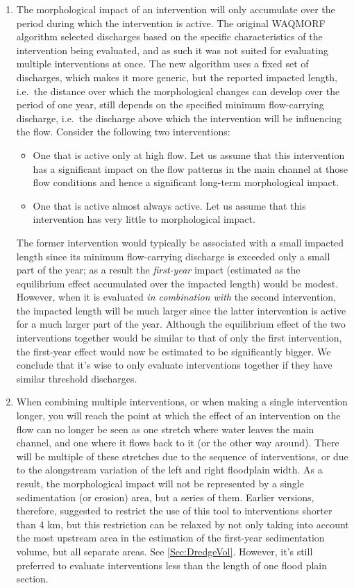 \begin{enumerate}
\item The morphological impact of an intervention will only accumulate over the period during which the intervention is active.
The original WAQMORF algorithm selected discharges based on the specific characteristics of the intervention being evaluated, and as such it was not suited for evaluating multiple interventions at once.
The new algorithm uses a fixed set of discharges, which makes it more generic, but the reported impacted length, i.e.~the distance over which the morphological changes can develop over the period of one year, still depends on the specified minimum flow-carrying discharge, i.e.~the discharge above which the intervention will be influencing the flow.
Consider the following two interventions:
\begin{itemize}
\item One that is active only at high flow.
Let us assume that this intervention has a significant impact on the flow patterns in the main channel at those flow conditions and hence a significant long-term morphological impact.
\item One that is active almost always active.
Let us assume that this intervention has very little to morphological impact.
\end{itemize}
The former intervention would typically be associated with a small impacted length since its minimum flow-carrying discharge is exceeded only a small part of the year; as a result the \emph{first-year} impact (estimated as the equilibrium effect accumulated over the impacted length) would be modest.
However, when it is evaluated \emph{in combination with} the second intervention, the impacted length will be much larger since the latter intervention is active for a much larger part of the year.
Although the equilibrium effect of the two interventions together would be similar to that of only the first intervention, the first-year effect would now be estimated to be significantly bigger.
We conclude that it's wise to only evaluate interventions together if they have similar threshold discharges.

\item When combining multiple interventions, or when making a single intervention longer, you will reach the point at which the effect of an intervention on the flow can no longer be seen as one stretch where water leaves the main channel, and one where it flows back to it (or the other way around).
There will be multiple of these stretches due to the sequence of interventions, or due to the alongstream variation of the left and right floodplain width.
As a result, the morphological impact will not be represented by a single sedimentation (or erosion) area, but a series of them.
Earlier versions, therefore, suggested to restrict the use of this tool to interventions shorter than 4 km, but this restriction can be relaxed by not only taking into account the most upstream area in the estimation of the first-year sedimentation volume, but all separate areas.
See \autoref{Sec:DredgeVol}.
However, it's still preferred to evaluate interventions less than the length of one flood plain section.


\end{enumerate}
